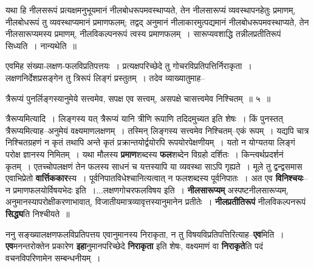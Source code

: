 \documentclass[article,12pt,a4paper]{memoir}
\begin{document}
	यथा हि नीलसरूपं प्रत्यक्षमनुभूयमानं नीलबोधरूपमवस्थाप्यते, तेन नीलसारूप्यं व्यवस्थापनहेतुः प्रमाणम्, नीलबोधरूपं तु व्यवस्थाप्यमानं प्रमाणफलम्; तद्वद् अनुमानं नीलाकारमुत्पद्यमानं नीलबोधरूपमवस्थाप्यते, तेन नीलसारूप्यमस्य प्रमाणम्, नीलविकल्पनरूपं त्वस्य प्रमाणफलम् । सारूप्यवशाद्धि तन्नीलप्रतीतिरूपं सिध्यति । नान्यथेति ॥  
	  
	एवमिह संख्या-लक्षण-फलविप्रतिपत्तयः । प्रत्यक्षपरिच्छेदे तु गोचरविप्रतिपत्तिर्निराकृता । लक्षणनिर्देशप्रसङ्गेन तु त्रिरूपं लिङ्गं प्रस्तुतम् । तदेव व्याख्यातुमाह--  
	  
	त्रैरूप्यं पुनर्लिङ्गस्यानुमेये सत्त्वमेव, सपक्ष एव सत्त्वम्, असपक्षे चासत्त्वमेव निश्चितम् ॥ ५ ॥ 
	  
	त्रैरूप्यमित्यादि । लिङ्गस्य यत् त्रैरूप्यं यानि त्रीणि रूपाणि तदिदमुच्यत इति शेषः । किं पुनस्तत् त्रैरूप्यमित्याह--अनुमेयं वक्ष्यमाणलक्षणम् । तस्मिन् लिङ्गस्य सत्त्वमेव निश्चितम्--एकं रूपम् । यद्यपि चात्र निश्चितग्रहणं न कृतं तथापि अन्ते कृतं प्रक्रान्तयोर्द्वयोरपि रूपयोरपेक्षणीयम् । यतो न योग्यतया लिङ्गं परोक्ष ज्ञानस्य निमितम् । यथा मौलस्य \textbf{प्रमाण}शब्दस्य \textbf{फल}शब्देन विग्रहो दर्शितः । किन्त्व\leavevmode{}र्थप्रदर्शनं कृतम् । एतच्चोपलक्षणं तेन फलस्य साधनं च यत्तस्यापि या व्यवस्था साऽपि गृह्यते । मूले तु द्वन्द्वसमास एवाभिप्रेतो \textbf{वार्त्तिककार}स्य । पूर्वनिपातविधेश्चानित्यत्वात् न फलशब्दस्य पूर्वनिपातः । अत एव \textbf{विनिश्चयः}--न प्रमाणफलयोर्विषयभेदः इति ।...लक्षणगोचरफलविषय इति । \textbf{नीलसारूप्यम्} अस्पष्टनीलसारूप्यम्, अनुमानस्यापरोक्षीकरणाभावात्, विजातीयमात्रव्यावृत्तस्यानुमानेन प्रतीतेः । \textbf{नीलप्रतीतिरूपं} नीलविकल्पनरूपं \textbf{सिद्ध्य}ति निश्चीयते ॥
	\pend
      

	  \pstart ननु सङ्ख्यालक्षणफलविप्रतिपत्तय एवानुमानस्य निराकृता, न तु विषयविप्रतिपत्तिरित्याह--\textbf{एव}मिति । \textbf{एव}मनन्तरोक्तेन प्रकारेण \textbf{इहा}नुमानपरिच्छेदे \textbf{निराकृता} इति शेषः, वक्ष्यमाणं वा \textbf{निराकृते}ति पदं वचनविपरिणामेन सम्बन्धनीयम् ।
	\pend
      
\end{document}

